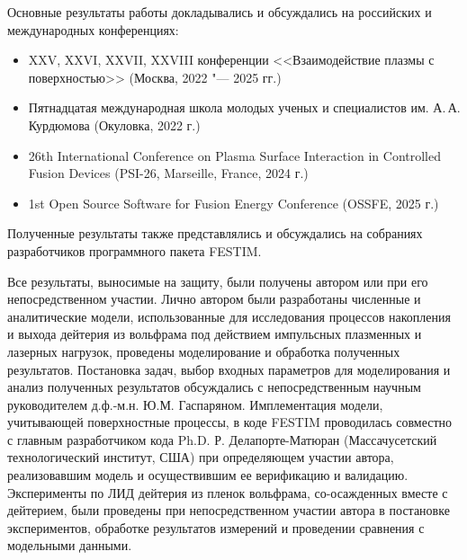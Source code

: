 {\probation}
Основные результаты работы докладывались и обсуждались на российских и международных конференциях:
\begin{itemize}
    \item XXV, XXVI, XXVII, XXVIII конференции <<Взаимодействие плазмы с поверхностью>> (Москва, 2022 "--- 2025 гг.)
    \item Пятнадцатая международная школа молодых ученых и специалистов им. А.\,А. Курдюмова (Окуловка, 2022 г.)
    \item 26th International Conference on Plasma Surface Interaction in Controlled Fusion Devices (PSI-26, Marseille, France, 2024 г.)
    \item 1st Open Source Software for Fusion Energy Conference (OSSFE, 2025 г.)
\end{itemize}
Полученные результаты также представлялись и обсуждались на собраниях разработчиков программного пакета FESTIM. 

{\contribution} Все результаты, выносимые на защиту, были получены автором или при его непосредственном участии. Лично автором были разработаны численные и аналитические модели, использованные для исследования процессов накопления и выхода дейтерия из вольфрама под действием импульсных плазменных и лазерных нагрузок, проведены моделирование и обработка полученных результатов. Постановка задач, выбор входных параметров для моделирования и анализ полученных результатов обсуждались с непосредственным научным руководителем д.ф.-м.н. Ю.М. Гаспаряном. Имплементация модели, учитывающей поверхностные процессы, в коде FESTIM проводилась совместно с главным разработчиком кода Ph.D. Р. Делапорте-Матюран (Массачусетский технологический институт, США) при определяющем участии автора, реализовавшим модель и осуществившим ее верификацию и валидацию. Эксперименты по ЛИД дейтерия из пленок вольфрама, со-осажденных вместе с дейтерием, были проведены  при непосредственном участии автора в постановке экспериментов, обработке результатов измерений и проведении сравнения с модельными данными.

